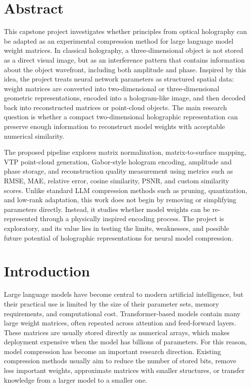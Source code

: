 \documentclass{article}
\begin{document}
    \begin{normalsize}
    
    	\section{Abstract}
        This capstone project investigates whether principles from optical holography can be adapted as an experimental compression method for large language model weight matrices. In classical holography, a three-dimensional object is not stored as a direct visual image, but as an interference pattern that contains information about the object wavefront, including both amplitude and phase. Inspired by this idea, the project treats neural network parameters as structured spatial data: weight matrices are converted into two-dimensional or three-dimensional geometric representations, encoded into a hologram-like image, and then decoded back into reconstructed matrices or point-cloud objects. The main research question is whether a compact two-dimensional holographic representation can preserve enough information to reconstruct model weights with acceptable numerical similarity.

        The proposed pipeline explores matrix normalization, matrix-to-surface mapping, VTP point-cloud generation, Gabor-style hologram encoding, amplitude and phase storage, and reconstruction quality measurement using metrics such as RMSE, MAE, relative error, cosine similarity, PSNR, and custom similarity scores. Unlike standard LLM compression methods such as pruning, quantization, and low-rank adaptation, this work does not begin by removing or simplifying parameters directly. Instead, it studies whether model weights can be re-represented through a physically inspired encoding process. The project is exploratory, and its value lies in testing the limits, weaknesses, and possible future potential of holographic representations for neural model compression.

        \section{Introduction}
        Large language models have become central to modern artificial intelligence, but their practical use is limited by the size of their parameter sets, memory requirements, and computational cost. Transformer-based models contain many large weight matrices, often repeated across attention and feed-forward layers. These matrices are usually stored directly as numerical arrays, which makes deployment expensive when the model has billions of parameters. For this reason, model compression has become an important research direction. Existing compression methods usually aim to reduce the number of stored bits, remove less important weights, approximate matrices with smaller structures, or transfer knowledge from a larger model to a smaller one.


\end{normalsize}
\end{document}
